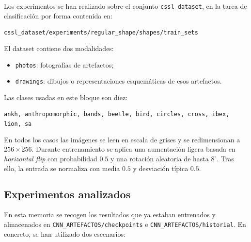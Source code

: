 \documentclass[11pt,a4paper]{report}
\begin{document}
Los experimentos se han realizado sobre el conjunto \texttt{cssl\_dataset}, en la tarea de clasificaci\'on por forma contenida en:

\begin{center}
\texttt{cssl\_dataset/experiments/regular\_shape/shapes/train\_sets}
\end{center}

El dataset contiene dos modalidades:

\begin{itemize}
    \item \texttt{photos}: fotograf\'ias de artefactos;
    \item \texttt{drawings}: dibujos o representaciones esquem\'aticas de esos artefactos.
\end{itemize}

Las clases usadas en este bloque son diez:

\begin{center}
\texttt{ankh, anthropomorphic, bands, beetle, bird, circles, cross, ibex, lion, sa}
\end{center}

En todos los casos las im\'agenes se leen en escala de grises y se redimensionan a $256\times256$. Durante entrenamiento se aplica una aumentaci\'on ligera basada en \textit{horizontal flip} con probabilidad $0.5$ y una rotaci\'on aleatoria de hasta $8^\circ$. Tras ello, la entrada se normaliza con media $0.5$ y desviaci\'on t\'ipica $0.5$.

\subsection{Experimentos analizados}

En esta memoria se recogen los resultados que ya estaban entrenados y almacenados en \texttt{CNN\_ARTEFACTOS/checkpoints} e \texttt{CNN\_ARTEFACTOS/historial}. En concreto, se han utilizado dos escenarios:

\begin{table}[H]
\centering
\caption{Configuraci\'on de los experimentos analizados.}
\end{table}
\end{document}
